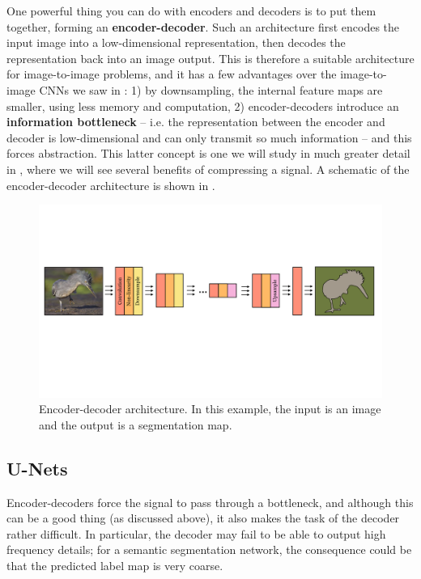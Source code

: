 One powerful thing you can do with encoders and decoders is to put them together, forming an \textbf{encoder-decoder}. Such an architecture first encodes the input image into a low-dimensional representation, then decodes the representation back into an image output. This is therefore a suitable architecture for image-to-image problems, and it has a few advantages over the image-to-image CNNs we saw in \sect{\ref{sec:convolutional_neural_networks:spatial_outputs}}: 1) by downsampling, the internal feature maps are smaller, using less memory and computation, 2) encoder-decoders introduce an \textbf{information bottleneck} -- i.e. the representation between the encoder and decoder is low-dimensional and can only transmit so much information -- and this forces abstraction. This latter concept is one we will study in much greater detail in \chap{\ref{chapter:representation_learning}}, where we will see several benefits of compressing a signal. A schematic of the encoder-decoder architecture is shown in \fig{\ref{fig:convolutional_neural_nets:encoder_decoders}}.
\begin{figure}[h]
    \centerline{
        \includegraphics[width=1\linewidth]{./figures/convolutional_neural_nets/encoder_decoder_arch.pdf}
    }
    \caption{Encoder-decoder architecture. In this example, the input is an image and the output is a segmentation map.}
    \label{fig:convolutional_neural_nets:encoder_decoders}
\end{figure}

\subsection{U-Nets}\label{sec:convolutional_neural_nets:unet}
Encoder-decoders force the signal to pass through a bottleneck, and although this can be a good thing (as discussed above), it also makes the task of the decoder rather difficult. In particular, the decoder may fail to be able to output high frequency details; for a semantic segmentation network, the consequence could be that the predicted label map is very coarse.

